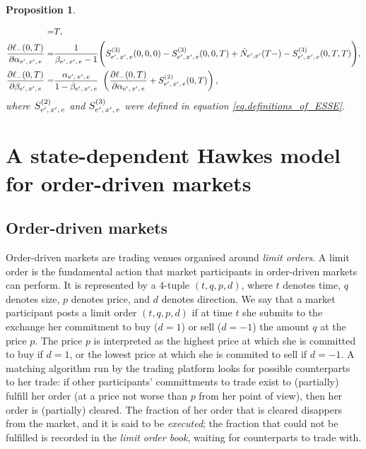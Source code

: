 \documentclass[10pt, article,table]{article}
\newtheorem{prop}[thm]{Proposition}
\begin{document}
\begin{prop}
\begin{itemize}
\begin{equation}
\begin{split}
   =&
   T,
   \\
   \frac{\partial\ell_{-}(0,T)}{\partial\alpha_{e^{\prime},\, x^{\prime},\, e}}
   =&
   \frac{1}{\beta_{e^{\prime},\, x^{\prime},\, e} - 1}
   \Bigg(
   S^{(3)}_{e^{\prime},\, x^{\prime},\, e}(0,0,0)  - S^{(3)}_{e^{\prime},\, x^{\prime},\, e}(0,0,T)
    +\tilde{N}_{e^{\prime},x^{\prime}}(T-)
   - S^{(3)}_{e^{\prime},\, x^{\prime},\, e}(0,T,T)
   \Bigg),
   \\
   \frac{\partial\ell_{-}(0,T)}{\partial\beta_{e^{\prime},\, x^{\prime},\, e}}
   =&
   \frac{\alpha_{e^{\prime},\, x^{\prime},\, e}}{1-\beta_{e^{\prime},\, x^{\prime},\, e}}\
   \left(
   \frac{\partial\ell_{-}(0,T)}{\partial\alpha_{e^{\prime},\, x^{\prime},\, e}}
   +S^{(2)}_{e^{\prime},\, x^{\prime},\, e}(0,T)
   \right),
  \end{split}
 \end{equation}
 where $S^{(2)}_{e^{\prime},\, x^{\prime},\, e}$ and $S^{(3)}_{e^{\prime},\, x^{\prime},\, e}$ were defined in equation \eqref{eq.definitions_of_ESSE}.
 \end{itemize}
\end{prop}

\section{A state-dependent Hawkes model for order-driven markets}

\subsection{Order-driven markets}\label{sec.order-driven_markets}
Order-driven markets are trading venues organised around \emph{limit orders}. A limit order is the fundamental action that market participants in order-driven markets can perform. It is represented by a 4-tuple $(t,q,p,d)$, where $t$ denotes time, $q$ denotes size, $p$ denotes price, and $d$ denotes direction. We say that a market participant posts a limit order $(t,q,p,d)$ if at time $t$ she submits to the exchange her commitment to buy ($d=1$) or sell ($d=-1$) the amount $q$ at the price $p$. The price $p$ is interpreted as the highest price at which she is committed to buy if $d=1$, or the lowest price at which she is commited to sell if $d=-1$. A matching algorithm run by the trading platform looks for possible counterparts to her trade: if other participants' committments to trade exist to (partially) fulfill her order (at a price not worse than $p$ from her point of view), then her order is (partially) cleared. The fraction of her order that is cleared disappers from the market, and it is said to be \emph{executed};  the fraction that could not be fulfilled is recorded in the \emph{limit order book}, waiting for counterparts to trade with.
\end{document}
